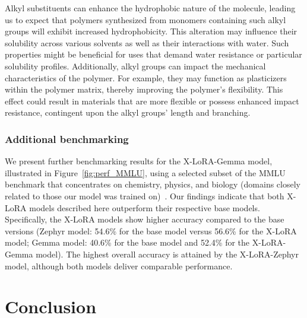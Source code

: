 Alkyl substituents can enhance the hydrophobic nature of the molecule, leading us to expect that polymers synthesized from monomers containing such alkyl groups will exhibit increased hydrophobicity. This alteration may influence their solubility across various solvents as well as their interactions with water. Such properties might be beneficial for uses that demand water resistance or particular solubility profiles. Additionally, alkyl groups can impact the mechanical characteristics of the polymer. For example, they may function as plasticizers within the polymer matrix, thereby improving the polymer's flexibility. This effect could result in materials that are more flexible or possess enhanced impact resistance, contingent upon the alkyl groups' length and branching.

\subsubsection{Additional benchmarking} We present further benchmarking results for the X-LoRA-Gemma model, illustrated in Figure~\ref{fig:perf_MMLU}, using a selected subset of the MMLU benchmark that concentrates on chemistry, physics, and biology (domains closely related to those our model was trained on)~\cite{Hendrycks2020MeasuringUnderstanding}. Our findings indicate that both X-LoRA models described here outperform their respective base models. Specifically, the X-LoRA models show higher accuracy compared to the base versions (Zephyr model: 54.6\% for the base model versus 56.6\% for the X-LoRA model; Gemma model: 40.6\% for the base model and 52.4\% for the X-LoRA-Gemma model). The highest overall accuracy is attained by the X-LoRA-Zephyr model, although both models deliver comparable performance.

\section{Conclusion}

